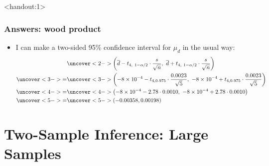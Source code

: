 \documentclass[handout]{beamer}\usepackage[]{graphicx}\usepackage[]{color}
\newcommand{\answers}{1}
\providecommand{\ov}[1]{\overline{#1}}
\numberwithin{equation}{section}
\begin{document}
\begin{frame}<handout:\answers>
\frametitle{Answers: wood product} \scriptsize
\begin{itemize}
\item I can make a two-sided 95\% confidence interval for $\mu_d$ in the usual way:
\begin{align*}
&\uncover<2->{\left (\ov{d} - t_{4, \ 1 - \alpha/2} \cdot \frac{s}{\sqrt{n}}, \ \ov{d} + t_{4, \ 1 - \alpha/2} \cdot \frac{s}{\sqrt{n}}\right)} \\
\uncover<3->{=}&\uncover<3->{ \left (-8 \times 10^{-4} - t_{4, 0.975} \cdot \frac{0.0023}{\sqrt{5}}, \ -8 \times 10^{-4} + t_{4, 0.975} \cdot \frac{0.0023}{\sqrt{5}} \right ) } \\
\uncover<4->{=}& \uncover<4->{\left (-8 \times 10^{-4} - 2.78 \cdot 0.0010, \ -8 \times 10^{-4} + 2.78 \cdot 0.0010 \right)} \\
\uncover<5->{=}& \uncover<5->{(-0.00358, 0.00198)}
\end{align*}
\end{itemize}
\end{frame}










\section{Two-Sample Inference: Large Samples}
\end{document}
